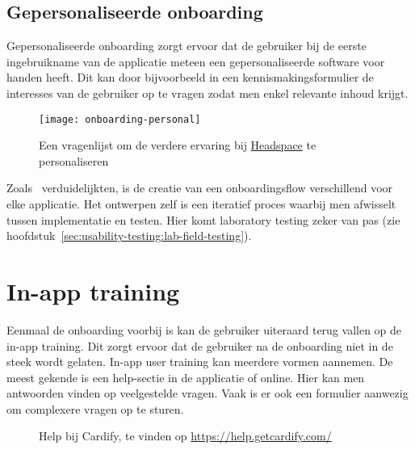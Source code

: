 \subsection{Gepersonaliseerde onboarding}
\label{sec:onboarding:gepersonaliseerd}

Gepersonaliseerde onboarding zorgt ervoor dat de gebruiker bij de eerste ingebruikname van de applicatie meteen een gepersonaliseerde software voor handen heeft. Dit kan door bijvoorbeeld in een kennismakingsformulier de interesses van de gebruiker op te vragen zodat men enkel relevante inhoud krijgt.

\begin{figure}[h!]
    \centering
    \texttt{[image: onboarding-personal]}
    \caption[Voorbeeld gepersonaliseerde onboarding]{Een vragenlijst om de verdere ervaring bij \href{https://www.headspace.com/}{Headspace} te personaliseren}
    \label{fig:onboarding:gepersonaliseerd}
\end{figure}

Zoals~\textcite{Strahm2018} verduidelijkten, is de creatie van een onboardingsflow verschillend voor elke applicatie. Het ontwerpen zelf is een iteratief proces waarbij men afwisselt tussen implementatie en testen. Hier komt laboratory testing zeker van pas (zie hoofdstuk~\ref{sec:usability-testing:lab-field-testing}).

\section{In-app training}
\label{sec:in-app-training}

Eenmaal de onboarding voorbij is kan de gebruiker uiteraard terug vallen op de in-app training. Dit zorgt ervoor dat de gebruiker na de onboarding niet in de steek wordt gelaten. In-app user training kan meerdere vormen aannemen. De meest gekende is een help-sectie in de applicatie of online. Hier kan men antwoorden vinden op veelgestelde vragen. Vaak is er ook een formulier aanwezig om complexere vragen op te sturen.

\begin{figure}
    \centering
    \qquad
    \caption[Voorbeeld help-sectie]{Help bij Cardify, te vinden op \url{https://help.getcardify.com/}}
    \label{fig:inapptraining:help}
\end{figure}


